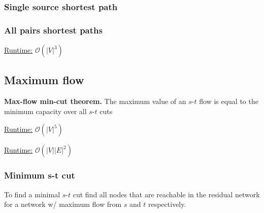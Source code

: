 \subsubsection{Single source shortest path}



\subsubsection{All pairs shortest paths}
\underline{Runtime:} $\mathcal{O}(\lvert V \rvert^3)$


\subsection{Maximum flow}

\textbf{Max-flow min-cut theorem.} The maximum value of an $s$-$t$ flow is
equal to the minimum capacity over all $s$-$t$ cuts

\underline{Runtime:} $\mathcal{O}(\lvert V \rvert^5)$


\underline{Runtime:} $\mathcal{O}(\lvert V \rvert \lvert E \rvert^2)$


\subsubsection{Minimum s-t cut}

To find a minimal $s$-$t$ cut find all nodes that are reachable in the
residual network for a network w/ maximum flow from $s$ and $t$
respectively.



